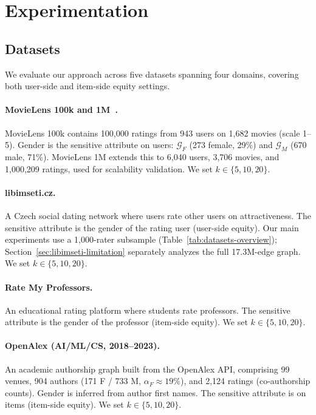 \documentclass[a4paper,fleqn]{cas-dc}
\begin{document}
\section{Experimentation}\label{sec:experimentation}
\subsection{Datasets}

We evaluate our approach across five datasets spanning four domains,
covering both user-side and item-side equity settings.

\paragraph{MovieLens 100k and 1M~\cite{harper2015movielens}.}
MovieLens 100k contains 100,000 ratings from 943 users on 1,682 movies
(scale 1--5). Gender is the sensitive attribute on users: $\mathcal{G}_F$
(273 female, 29\%) and $\mathcal{G}_M$ (670 male, 71\%). MovieLens 1M
extends this to 6,040 users, 3,706 movies, and 1,000,209 ratings, used
for scalability validation. We set $k \in \{5, 10, 20\}$.

\paragraph{libimseti.cz.}
A Czech social dating network where users rate other users on attractiveness.
The sensitive attribute is the gender of the rating user (user-side equity).
Our main experiments use a 1,000-rater subsample
(Table~\ref{tab:datasets-overview}); Section~\ref{sec:libimseti-limitation}
separately analyzes the full 17.3M-edge graph. We set
$k \in \{5, 10, 20\}$.

\paragraph{Rate My Professors.}
An educational rating platform where students rate professors. The sensitive
attribute is the gender of the professor (item-side equity). We set
$k \in \{5, 10, 20\}$.

\paragraph{OpenAlex (AI/ML/CS, 2018--2023).}
An academic authorship graph built from the OpenAlex API,
comprising 99 venues, 904 authors (171 F / 733 M, $\alpha_F \approx 19\%$),
and 2,124 ratings (co-authorship counts). Gender is inferred from author
first names. The sensitive attribute is on items (item-side equity).
We set $k \in \{5, 10, 20\}$.
\end{document}

